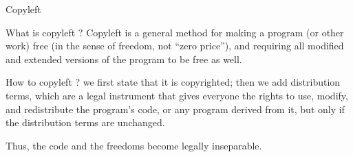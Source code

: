 \documentclass{beamer}
\begin{document}
\begin{frame}[plain]%
%  
\end{frame}

\begin{frame}{Copyleft}

  \begin{block}{What is copyleft ?}
    Copyleft is a general method for making a program (or other work)
    free (in the sense of freedom, not “zero price”), and requiring
    all modified and extended versions of the program to be free as
    well.
  \end{block}

  \begin{block}{How to copyleft ?}
    we first state that it is copyrighted; then we add distribution
    terms, which are a legal instrument that gives everyone the rights
    to use, modify, and redistribute the program's code, or any
    program derived from it, but only if the distribution terms are
    unchanged.

    Thus, the code and the freedoms become legally inseparable.
  \end{block}

    
\end{frame}
\end{document}
